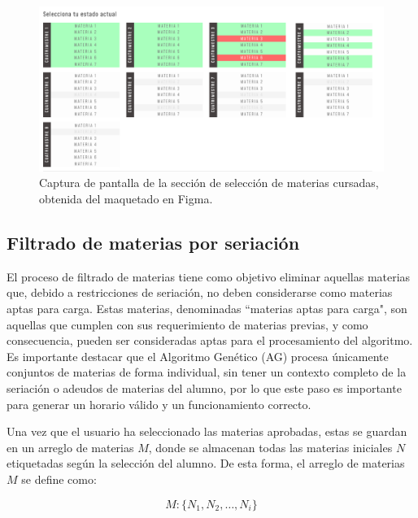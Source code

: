 \begin{figure}[h]
    \centering
    \includegraphics[width=\textwidth]{images/current_status_figma_screenshot.png}
    \caption{Captura de pantalla de la sección de selección de materias cursadas, obtenida del maquetado en Figma.}
    \label{fig:captura_materias}
\end{figure}

\subsection{Filtrado de materias por seriación} \label{filtrado_de_materias_por_seriacion}
El proceso de filtrado de materias tiene como objetivo eliminar aquellas materias que, debido a restricciones de seriación, no deben considerarse como materias aptas para carga. Estas materias, denominadas ``materias aptas para carga", son aquellas que cumplen con sus requerimiento de materias previas, y como consecuencia, pueden ser consideradas aptas para el procesamiento del algoritmo. Es importante destacar que el Algoritmo Genético (AG) procesa únicamente conjuntos de materias de forma individual, sin tener un contexto completo de la seriación o adeudos de materias del alumno, por lo que este paso es importante para generar un horario válido y un funcionamiento correcto. %

Una vez que el usuario ha seleccionado las materias aprobadas, estas se guardan en un arreglo de materias \( M \), donde se almacenan todas las materias iniciales \( N \) etiquetadas según la selección del alumno. De esta forma, el arreglo de materias \( M \) se define como: %

\begin{equation}
    M : \{ N_1, N_2, \dots, N_i \}
    \label{eq:arreglo_materias_sin_procesar}
\end{equation} 

